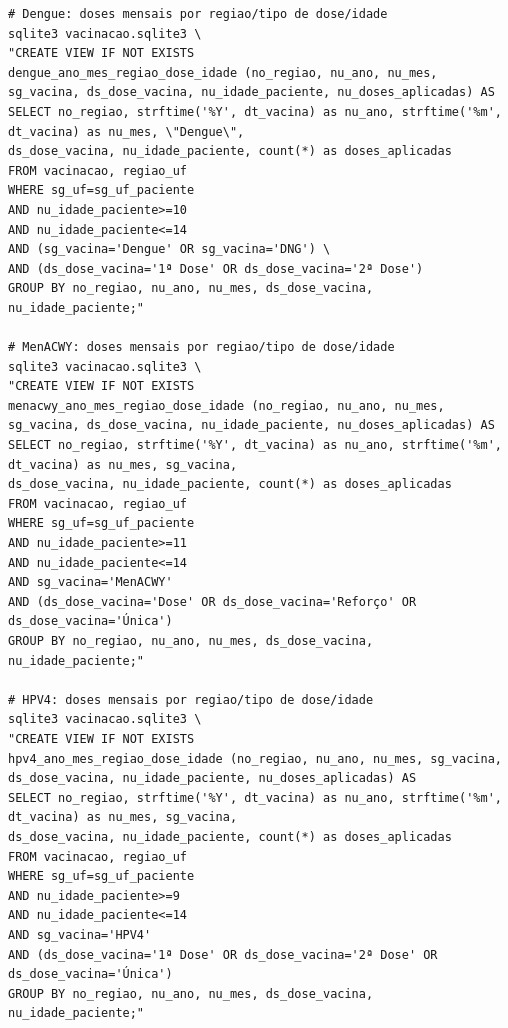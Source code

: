 \documentclass[12pt]{article}
\begin{document}
\begin{verbatim}
# Dengue: doses mensais por regiao/tipo de dose/idade
sqlite3 vacinacao.sqlite3 \
"CREATE VIEW IF NOT EXISTS
dengue_ano_mes_regiao_dose_idade (no_regiao, nu_ano, nu_mes, sg_vacina, ds_dose_vacina, nu_idade_paciente, nu_doses_aplicadas) AS
SELECT no_regiao, strftime('%Y', dt_vacina) as nu_ano, strftime('%m', dt_vacina) as nu_mes, \"Dengue\",
ds_dose_vacina, nu_idade_paciente, count(*) as doses_aplicadas
FROM vacinacao, regiao_uf
WHERE sg_uf=sg_uf_paciente
AND nu_idade_paciente>=10
AND nu_idade_paciente<=14
AND (sg_vacina='Dengue' OR sg_vacina='DNG') \
AND (ds_dose_vacina='1ª Dose' OR ds_dose_vacina='2ª Dose')
GROUP BY no_regiao, nu_ano, nu_mes, ds_dose_vacina, nu_idade_paciente;"

# MenACWY: doses mensais por regiao/tipo de dose/idade
sqlite3 vacinacao.sqlite3 \
"CREATE VIEW IF NOT EXISTS
menacwy_ano_mes_regiao_dose_idade (no_regiao, nu_ano, nu_mes, sg_vacina, ds_dose_vacina, nu_idade_paciente, nu_doses_aplicadas) AS
SELECT no_regiao, strftime('%Y', dt_vacina) as nu_ano, strftime('%m', dt_vacina) as nu_mes, sg_vacina,
ds_dose_vacina, nu_idade_paciente, count(*) as doses_aplicadas
FROM vacinacao, regiao_uf
WHERE sg_uf=sg_uf_paciente
AND nu_idade_paciente>=11
AND nu_idade_paciente<=14
AND sg_vacina='MenACWY'
AND (ds_dose_vacina='Dose' OR ds_dose_vacina='Reforço' OR ds_dose_vacina='Única')
GROUP BY no_regiao, nu_ano, nu_mes, ds_dose_vacina, nu_idade_paciente;"

# HPV4: doses mensais por regiao/tipo de dose/idade
sqlite3 vacinacao.sqlite3 \
"CREATE VIEW IF NOT EXISTS
hpv4_ano_mes_regiao_dose_idade (no_regiao, nu_ano, nu_mes, sg_vacina, ds_dose_vacina, nu_idade_paciente, nu_doses_aplicadas) AS
SELECT no_regiao, strftime('%Y', dt_vacina) as nu_ano, strftime('%m', dt_vacina) as nu_mes, sg_vacina,
ds_dose_vacina, nu_idade_paciente, count(*) as doses_aplicadas
FROM vacinacao, regiao_uf
WHERE sg_uf=sg_uf_paciente
AND nu_idade_paciente>=9
AND nu_idade_paciente<=14
AND sg_vacina='HPV4'
AND (ds_dose_vacina='1ª Dose' OR ds_dose_vacina='2ª Dose' OR ds_dose_vacina='Única')
GROUP BY no_regiao, nu_ano, nu_mes, ds_dose_vacina, nu_idade_paciente;"


\end{verbatim}
\end{document}
